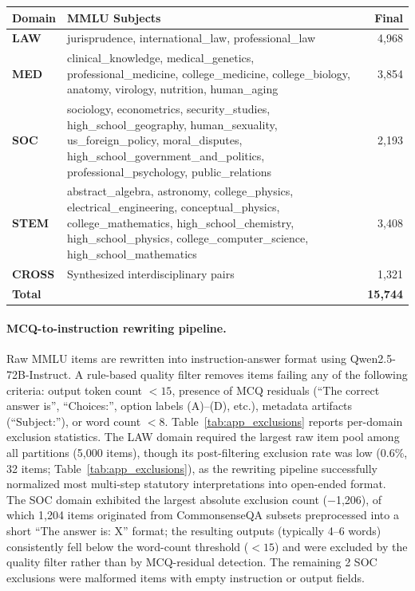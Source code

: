\documentclass[a4paper,fleql,doubleblind]{cas-sc}
\begin{document}
\vspace{6pt plus 4pt minus 3pt}
\begin{center}
\begingroup
{}
\label{tab:app_data}
\renewcommand{\arraystretch}{1.4}
\begin{tabular}{l >{\raggedright\arraybackslash}p{9cm} r}
\toprule
\textbf{Domain} & \textbf{MMLU Subjects} & \textbf{Final} \\
\midrule
\textbf{LAW}
  & jurisprudence, international\_law, professional\_law & 4,968 \\
\midrule
\textbf{MED}
  & clinical\_knowledge, medical\_genetics, professional\_medicine,
    college\_medicine, college\_biology, anatomy, virology, nutrition,
    human\_aging & 3,854 \\
\midrule
\textbf{SOC}
  & sociology, econometrics, security\_studies,
    high\_school\_geography, human\_sexuality, us\_foreign\_policy,
    moral\_disputes, high\_school\_government\_and\_politics,
    professional\_psychology, public\_relations & 2,193 \\
\midrule
\textbf{STEM}
  & abstract\_algebra, astronomy, college\_physics,
    electrical\_engineering, conceptual\_physics, college\_mathematics,
    high\_school\_chemistry, high\_school\_physics,
    college\_computer\_science, high\_school\_mathematics & 3,408 \\
\midrule
\textbf{CROSS} & Synthesized interdisciplinary pairs & 1,321 \\
\midrule
\textbf{Total} & & \textbf{15,744} \\
\bottomrule
\end{tabular}
\endgroup
\end{center}
\vspace{6pt plus 4pt minus 3pt}

\paragraph{MCQ-to-instruction rewriting pipeline.}
Raw MMLU items are rewritten into instruction-answer format using
Qwen2.5-72B-Instruct. A rule-based quality filter removes items failing
any of the following criteria: output token count $< 15$, presence of MCQ
residuals (``The correct answer is'', ``Choices:'', option labels
(A)--(D), etc.), metadata artifacts (``Subject:''), or word count $< 8$.
Table~\ref{tab:app_exclusions} reports per-domain exclusion statistics.
The LAW domain required the largest raw item pool among all partitions
(5,000 items), though its post-filtering exclusion rate was low (0.6\%,
32 items; Table~\ref{tab:app_exclusions}), as the rewriting pipeline
successfully normalized most multi-step statutory interpretations into
open-ended format. The SOC domain exhibited the largest absolute exclusion count
($-$1,206), of which 1,204 items originated from CommonsenseQA subsets
preprocessed into a short ``The answer is: X'' format; the resulting
outputs (typically 4--6 words) consistently fell below the word-count
threshold ($< 15$) and were excluded by the quality filter rather than by
MCQ-residual detection. The remaining 2 SOC exclusions were malformed items
with empty instruction or output fields.
\end{document}
